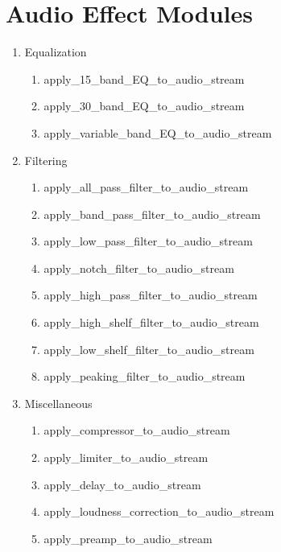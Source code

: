 \section{Audio Effect Modules}

\begin{enumerate}

	\item Equalization
	\begin{enumerate}
		\item apply\_15\_band\_EQ\_to\_audio\_stream
		\item apply\_30\_band\_EQ\_to\_audio\_stream
		\item apply\_variable\_band\_EQ\_to\_audio\_stream
	\end{enumerate}

	\item Filtering
	\begin{enumerate}
		\item apply\_all\_pass\_filter\_to\_audio\_stream
		\item apply\_band\_pass\_filter\_to\_audio\_stream
		\item apply\_low\_pass\_filter\_to\_audio\_stream
		\item apply\_notch\_filter\_to\_audio\_stream
		\item apply\_high\_pass\_filter\_to\_audio\_stream
		\item apply\_high\_shelf\_filter\_to\_audio\_stream
		\item apply\_low\_shelf\_filter\_to\_audio\_stream
		\item apply\_peaking\_filter\_to\_audio\_stream
	\end{enumerate}

	\item Miscellaneous
	\begin{enumerate}
		\item apply\_compressor\_to\_audio\_stream
		\item apply\_limiter\_to\_audio\_stream
		\item apply\_delay\_to\_audio\_stream
		\item apply\_loudness\_correction\_to\_audio\_stream
		\item apply\_preamp\_to\_audio\_stream
	\end{enumerate}

\end{enumerate}